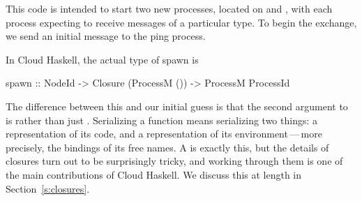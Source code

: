 \documentclass[preprint]{sigplanconf}
\begin{document}
This code is intended to start two new processes, located on  and , with each process expecting to receive messages of a particular type. To begin the exchange, we send an initial  message to the ping process.

In Cloud Haskell, the actual type of spawn is
\begin{code}
spawn :: NodeId -> Closure (ProcessM ()) 
      -> ProcessM ProcessId
\end{code}
\noindent
The difference between this and our initial guess is that the second argument to  is  rather than just .
Serializing a function means serializing two things: a representation of its code, and a representation of its environment\,---\,more precisely, the bindings of its free names.
A  is exactly this, but the details of closures turn out to be surprisingly tricky, and working through them is one of the main contributions of Cloud Haskell.
We discuss this at length in Section~\ref{s:closures}.
\end{document}
